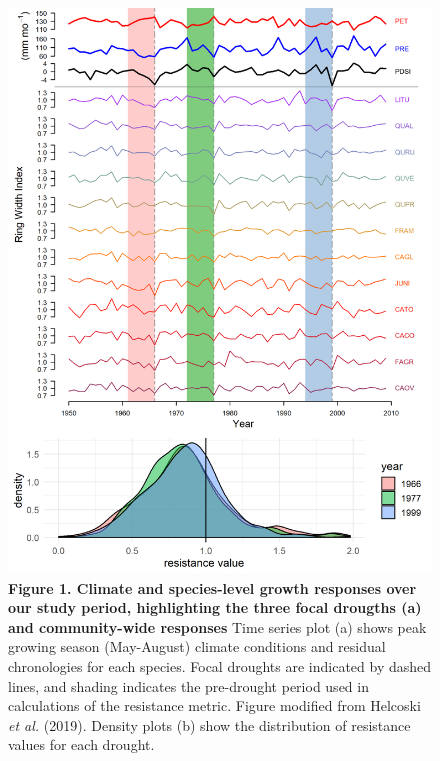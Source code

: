\documentclass[
]{article}
\begin{document}
\begin{figure}
\centering
\includegraphics[width=5.20833in,height=\textheight]{tables_figures/Figure1.png}
\caption{\textbf{Figure 1. Climate and species-level growth responses
over our study period, highlighting the three focal drougths (a) and
community-wide responses} Time series plot (a) shows peak growing season
(May-August) climate conditions and residual chronologies for each
species. Focal droughts are indicated by dashed lines, and shading
indicates the pre-drought period used in calculations of the resistance
metric. Figure modified from Helcoski \emph{et al.} (2019). Density
plots (b) show the distribution of resistance values for each drought.}
\end{figure}
\end{document}
